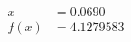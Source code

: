 \documentclass[preview]{standalone}
\begin{document}
\begin{align*}
x &= 0.0690\\f(x) &= 4.1279583
\end{align*}
\end{document}
